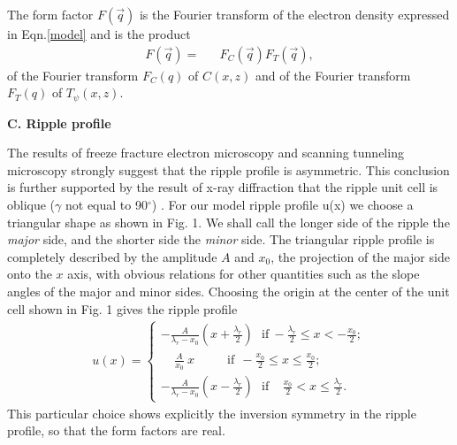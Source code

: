 The form factor $F(\vec{q})$ is the Fourier transform of the electron density
expressed in Eqn.\ref{model} and is the product
\begin{eqnarray}
\label{formall}
F(\vec{q}) =&& F_C(\vec{q}) F_T(\vec{q}),
\end{eqnarray}
of the Fourier transform $F_{C}(q)$ of $C(x,z)$ and of the Fourier transform
$F_{T}(q)$ of $T_{\psi}(x,z)$.


\vspace{0.128in}
\noindent
{\bf C. Ripple profile}
\vspace{0.128in}

The results of freeze fracture electron microscopy 
\cite{Luna77,Cop80,Rup83} and
scanning tunneling microscopy \cite{Zas88a,Hata93} strongly suggest that the
ripple profile is asymmetric.  This conclusion is further supported by 
the result
of x-ray diffraction that the ripple unit cell is oblique
($\gamma$ not equal to 90$^{\circ}$) 
\cite{Tar73,JanSS79,Ino80,Ale85,Sir88,Wac89a,Kat95}.
For our model ripple profile
u(x) we choose a triangular shape as shown in
Fig. 1.  We shall call the longer side of the ripple
the {\it major} side, and the shorter side the {\it minor} side.
The triangular ripple profile is completely described by the amplitude
$A$ and $x_0$, the projection of the major side onto the $x$ axis,
with obvious relations for other quantities such as the slope angles
of the major and minor sides.  Choosing the origin at the center
of the unit cell shown in Fig. 1 gives the ripple profile
\begin{eqnarray}
\label{profile}
u(x) = \left\{ \begin{array}{ll}
		-\frac{A}{\lambda_r - x_0} (x + \frac{\lambda_r}{2})
\ \ \ \mbox{if}\ - \frac{\lambda_r}{2} \le x < - \frac{x_0}{2};\\
		\ \ \ \ \ \frac{A}{x_0}\ x\ \ \ \ \ \ \ \ \ \ \ \ \mbox{if}
\ \ - \frac{x_0}{2} \le x \le 
\frac{x_0}{2};\\
		-\frac{A}{\lambda_r - x_0} (x - \frac{\lambda_r}{2})
\ \ \ \mbox{if}\ \ \ \ \  \frac{x_0}{2} < x \le \frac{\lambda_r}{2}.
		\end{array}
	\right.
\end{eqnarray}
This particular choice shows explicitly the inversion
symmetry in the ripple profile, so that the form factors are real.

